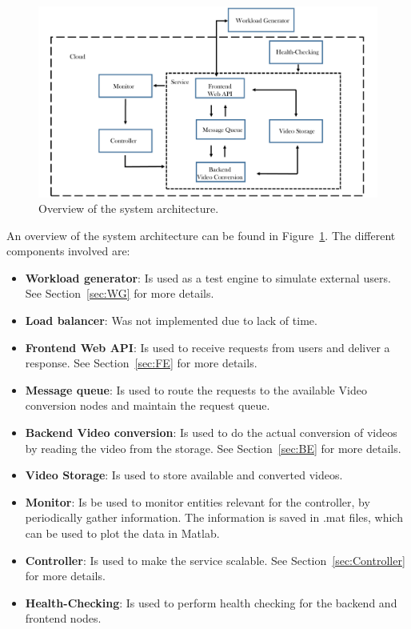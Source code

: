 \documentclass[a4paper, 10pt, english]{article}
\begin{document}
\begin{figure}
	\label{fig:architecture}
	\centering
	\includegraphics[width=1\textwidth]{figs/workflow-final.pdf}
	\caption{Overview of the system architecture.}
\end{figure}
An overview of the system architecture can be found in Figure~\ref{fig:architecture}. The different components involved are:
\begin{itemize}
	\item \textbf{Workload generator}: Is used as a test engine to simulate external users. See Section~\ref{sec:WG} for more details.
	\item \textbf{Load balancer}: Was not implemented due to lack of time.
	\item \textbf{Frontend Web API}: Is used to receive requests from users and deliver a response. See Section~\ref{sec:FE} for more details.
	\item \textbf{Message queue}: Is used to route the requests to the available Video conversion nodes and maintain the request queue. 
	\item \textbf{Backend Video conversion}: Is used to do the actual conversion of videos by reading the video from the storage. See Section~\ref{sec:BE} for more details.
	\item \textbf{Video Storage}: Is used to store available and converted videos.
	\item \textbf{Monitor}: Is be used to monitor entities relevant for the controller, by periodically gather information. The information is saved in .mat files, which can be used to plot the data in Matlab.
	\item \textbf{Controller}: Is used to make the service scalable. See Section~\ref{sec:Controller} for more details.
	\item \textbf{Health-Checking}: Is used to perform health checking for the backend and frontend nodes.
\end{itemize}
\end{document}
